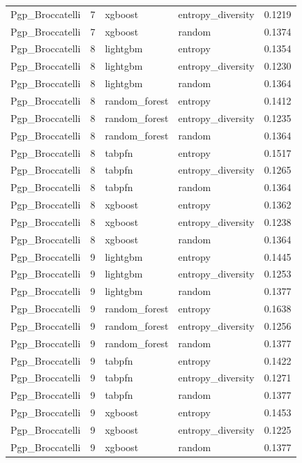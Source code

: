 \begin{tabular}{lrllr}
Pgp_Broccatelli & 7 & xgboost & entropy_diversity & 0.1219 \\
Pgp_Broccatelli & 7 & xgboost & random & 0.1374 \\
Pgp_Broccatelli & 8 & lightgbm & entropy & 0.1354 \\
Pgp_Broccatelli & 8 & lightgbm & entropy_diversity & 0.1230 \\
Pgp_Broccatelli & 8 & lightgbm & random & 0.1364 \\
Pgp_Broccatelli & 8 & random_forest & entropy & 0.1412 \\
Pgp_Broccatelli & 8 & random_forest & entropy_diversity & 0.1235 \\
Pgp_Broccatelli & 8 & random_forest & random & 0.1364 \\
Pgp_Broccatelli & 8 & tabpfn & entropy & 0.1517 \\
Pgp_Broccatelli & 8 & tabpfn & entropy_diversity & 0.1265 \\
Pgp_Broccatelli & 8 & tabpfn & random & 0.1364 \\
Pgp_Broccatelli & 8 & xgboost & entropy & 0.1362 \\
Pgp_Broccatelli & 8 & xgboost & entropy_diversity & 0.1238 \\
Pgp_Broccatelli & 8 & xgboost & random & 0.1364 \\
Pgp_Broccatelli & 9 & lightgbm & entropy & 0.1445 \\
Pgp_Broccatelli & 9 & lightgbm & entropy_diversity & 0.1253 \\
Pgp_Broccatelli & 9 & lightgbm & random & 0.1377 \\
Pgp_Broccatelli & 9 & random_forest & entropy & 0.1638 \\
Pgp_Broccatelli & 9 & random_forest & entropy_diversity & 0.1256 \\
Pgp_Broccatelli & 9 & random_forest & random & 0.1377 \\
Pgp_Broccatelli & 9 & tabpfn & entropy & 0.1422 \\
Pgp_Broccatelli & 9 & tabpfn & entropy_diversity & 0.1271 \\
Pgp_Broccatelli & 9 & tabpfn & random & 0.1377 \\
Pgp_Broccatelli & 9 & xgboost & entropy & 0.1453 \\
Pgp_Broccatelli & 9 & xgboost & entropy_diversity & 0.1225 \\
Pgp_Broccatelli & 9 & xgboost & random & 0.1377 \\
\bottomrule
\end{tabular}

